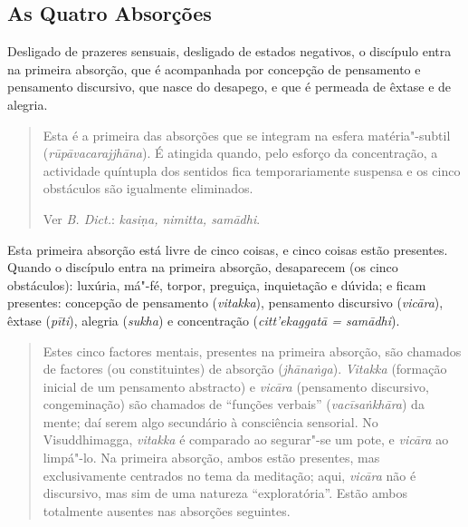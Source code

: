 \subsection{As Quatro Absorções}


Desligado de prazeres sensuais, desligado de estados negativos, o discípulo
entra na primeira absorção, que é acompanhada por concepção de pensamento e
pensamento discursivo, que nasce do desapego, e que é permeada de êxtase e de
alegria.


\begin{quote}
  Esta é a primeira das absorções que se integram na esfera matéria"-subtil
  (\emph{rūpāvacarajjhāna}). É atingida quando, pelo esforço da concentração, a
  actividade quíntupla dos sentidos fica temporariamente suspensa e os cinco
  obstáculos são igualmente eliminados.

  Ver \emph{B. Dict.}: \emph{kasi\d{n}a, nimitta, samādhi}.
\end{quote}

\clearpage

Esta primeira absorção está livre de cinco coisas, e cinco coisas estão
presentes. Quando o discípulo entra na primeira absorção, desaparecem (os
cinco obstáculos): luxúria, má"-fé, torpor, preguiça, inquietação e dúvida; e
ficam presentes: concepção de pensamento (\emph{vitakka}), pensamento discursivo
(\emph{vicāra}), êxtase (\emph{pīti}), alegria (\emph{sukha}) e concentração
(\emph{citt'ekaggatā = samādhi}).


\begin{quote}
  Estes cinco factores mentais, presentes na primeira absorção, são chamados de
  factores (ou constituintes) de absorção (\emph{jhāna\.{n}ga}). \emph{Vitakka}
  (formação inicial de um pensamento abstracto) e \emph{vicāra} (pensamento
  discursivo, congeminação) são chamados de “funções verbais”
  (\emph{vacīsa\.{n}khāra}) da mente; daí serem algo secundário à consciência
  sensorial. No Visuddhimagga, \emph{vitakka} é comparado ao segurar"-se um pote,
  e \emph{vicāra} ao limpá"-lo. Na primeira absorção, ambos estão presentes, mas
  exclusivamente centrados no tema da meditação; aqui, \emph{vicāra} não é
  discursivo, mas sim de uma natureza “exploratória”. Estão ambos totalmente
  ausentes nas absorções seguintes.
\end{quote}

